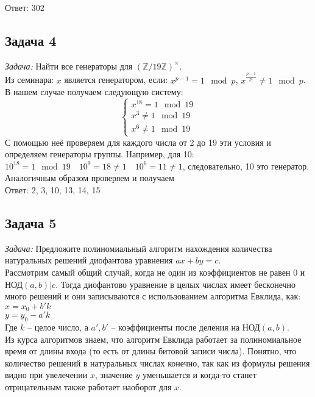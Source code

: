 \documentclass[a4paper,12pt]{article} %
\begin{document}
Ответ: 302



\subsection*{Задача 4}
\textit{Задача:} Найти все генераторы для $(\mathbb{Z}/19\mathbb{Z})^\times$.\\

Из семинара: $ x $ является генератором, если: $x^{p-1} = 1 \mod p$, $x^{\frac{p-1}{p_i}} \neq 1 \mod p$. В нашем случае получаем следующую систему: 
$$
\left\{\begin{array}{l}
x^{18} = 1 \mod 19 \\
x^{3} \neq 1 \mod 19 \\
x^{6} \neq 1 \mod 19
\end{array}\right.
$$
С помощью неё проверяем для каждого числа от 2 до 19 эти условия и определяем генераторы группы. Например, для 10: $ 10^18 = 1 \mod 19 \quad 10^9 = 18 \neq 1 \quad 10^6 = 11 \neq 1$, следовательно, 10 это генератор. Аналогичным образом проверяем и получаем\\

Ответ: 2, 3, 10, 13, 14, 15



\subsection*{Задача 5}
\textit{Задача:} Предложите полиномиальный алгоритм нахождения количества натуральных решений диофантова уравнения $ax+by = c$. \smallskip \\

Рассмотрим самый общий случай, когда не один из коэффициентов не равен 0 и НОД$(a,b) | c$. Тогда диофантово уравнение в целых числах имеет бесконечно много решений и они записываются с использованием алгоритма Евклида, как:\\
$x = x_0 + b'k$\\
$y = y_0 - a'k$\\
Где $ k $ -- целое число, а $ a', b' $ -- коэффициенты после деления на НОД$(a,b)$.\\
Из курса алгоритмов знаем, что алгоритм Евклида работает за полиномиальное время от длины входа (то есть от длины  битовой записи числа). Понятно, что количество решений в натуральных числах конечно, так как из формулы решения видно при увелечении $ x $, значение $ y $ уменьшается и когда-то станет отрицательным также работает наоборот для $ x $.\\ 
\end{document}
